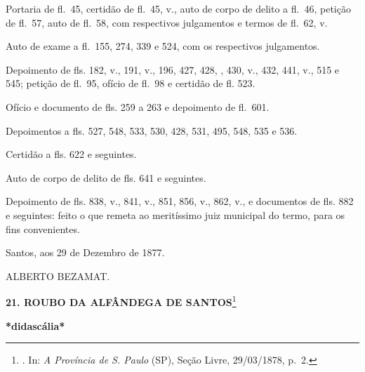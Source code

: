 Portaria de fl.~45, certidão de fl.~45, v., auto de corpo de delito a
fl.~46, petição de fl.~57, auto de fl.~58, com respectivos julgamentos e
termos de fl.~62, v.

Auto de exame a fl.~155, 274, 339 e 524, com os respectivos julgamentos.

Depoimento de fls. 182, v., 191, v., 196, 427, 428, , 430, v., 432, 441,
v., 515 e 545; petição de fl.~95, ofício de fl.~98 e certidão de fl.
523.

Ofício e documento de fls. 259 a 263 e depoimento de fl.~601.

Depoimentos a fls. 527, 548, 533, 530, 428, 531, 495, 548, 535 e 536.

Certidão a fls. 622 e seguintes.

Auto de corpo de delito de fls. 641 e seguintes.

Depoimento de fls. 838, v., 841, v., 851, 856, v., 862, v., e documentos
de fls. 882 e seguintes: feito o que remeta ao meritíssimo juiz
municipal do termo, para os fins convenientes.

Santos, aos 29 de Dezembro de 1877.

ALBERTO BEZAMAT.

\textbf{21. ROUBO DA ALFÂNDEGA DE SANTOS}\footnote{. In: \emph{A
  Província de S. Paulo} (SP), Seção Livre, 29/03/1878, p.~2.}

\textbf{*didascália*}

